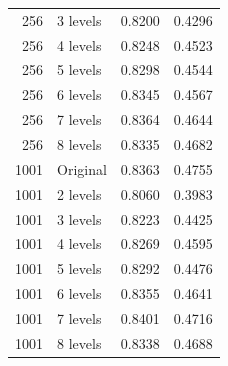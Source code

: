 \documentclass[11pt,a4paper]{article}
\begin{document}
\begin{longtable}{rlrr}
256 & 3 levels & 0.8200 & 0.4296 \\
256 & 4 levels & 0.8248 & 0.4523 \\
256 & 5 levels & 0.8298 & 0.4544 \\
256 & 6 levels & 0.8345 & 0.4567 \\
256 & 7 levels & 0.8364 & 0.4644 \\
256 & 8 levels & 0.8335 & 0.4682 \\
1001 & Original & 0.8363 & 0.4755 \\
1001 & 2 levels & 0.8060 & 0.3983 \\
1001 & 3 levels & 0.8223 & 0.4425 \\
1001 & 4 levels & 0.8269 & 0.4595 \\
1001 & 5 levels & 0.8292 & 0.4476 \\
1001 & 6 levels & 0.8355 & 0.4641 \\
1001 & 7 levels & 0.8401 & 0.4716 \\
1001 & 8 levels & 0.8338 & 0.4688 \\
\bottomrule
\end{longtable}
\end{document}
